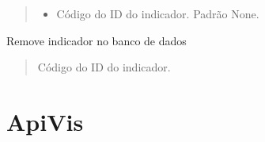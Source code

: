 \documentclass[letterpaper,10pt,brazil]{sphinxmanual}
\begin{document}
\begin{fulllineitems}
\begin{fulllineitems}
\begin{quote}
\begin{description}
\begin{itemize}
\item {} 
\sphinxAtStartPar
{} \textendash{} Código do ID do indicador. Padrão None.

\end{itemize}

\end{description}\end{quote}

\end{fulllineitems}


\begin{fulllineitems}
\label{\detokenize{api_gen/apiModulo.api_insercao:apiModulo.api_insercao.ApiIns.removerIndicador}}
\pysigstartsignatures
{}
\pysigstopsignatures
\sphinxAtStartPar
Remove indicador no banco de dados
\begin{quote}\begin{description}
\sphinxAtStartPar
{} \textendash{} Código do ID do indicador.

\end{description}\end{quote}

\end{fulllineitems}


\end{fulllineitems}


\sphinxstepscope


\section{ApiVis}
\label{\detokenize{api_gen/apiModulo.api_visualizacao:apivis}}\label{\detokenize{api_gen/apiModulo.api_visualizacao::doc}}
\end{document}
